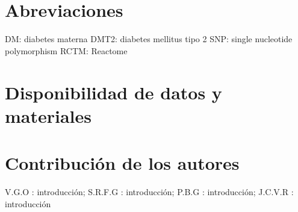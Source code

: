 \documentclass{bmcart}
\begin{document}
\begin{frontmatter}
\begin{abstractbox}
\begin{abstract}
			
			\end{abstract}
			
			
			\begin{keyword}
			\end{keyword}
		
		
		\end{abstractbox}
	
	\end{frontmatter}
	
	
	
	
	
	
	
	
	
	
	
	\begin{backmatter}
	
		\section*{Abreviaciones}%
		DM: diabetes materna
		DMT2: diabetes mellitus tipo 2
		SNP: single nucleotide polymorphism 
		RCTM: Reactome
		
		\section*{Disponibilidad de datos y materiales}%
		
		\section*{Contribución de los autores}
			V.G.O : introducción; S.R.F.G : introducción; P.B.G : introducción; J.C.V.R : introducción
		
		
		
	
	\end{backmatter}
\end{document}
